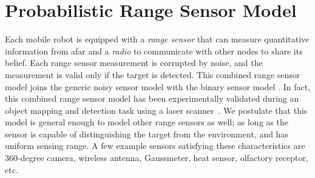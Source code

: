 \documentclass[letterpaper, 10 pt, conference]{ieeeconf}
\begin{document}
\section{Probabilistic Range Sensor Model}
\label{sec:sec3}
Each mobile robot is equipped with a \emph{range sensor} that can measure quantitative information from afar and a \emph{radio} to communicate with other nodes to share its belief. 
Each range sensor measurement is corrupted by noise, and the measurement is valid only if the target is detected. 
This combined range sensor model joins the generic noisy sensor model with the binary sensor model \cite{djuric2008target}.
In fact, this combined range sensor model has been experimentally validated during an object mapping and detection task using a laser scanner~\cite{anguelov2004detecting}.
We postulate that this model is general enough to model other range sensors as well; as long as the sensor is capable of distinguishing the target from the environment, and has uniform sensing range. 
A few example sensors satisfying these characteristics are 360-degree camera, wireless antenna, Gaussmeter, heat sensor, olfactory receptor, etc.
\end{document}
